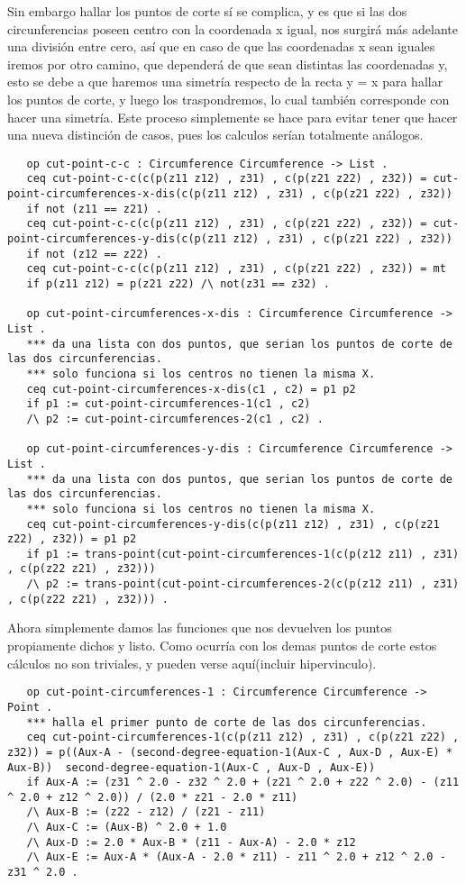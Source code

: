 {Sin embargo hallar los puntos de corte sí se complica, y es que si las dos circunferencias poseen centro con la coordenada x igual, nos surgirá más adelante una división entre cero, así que en caso de que las coordenadas x sean iguales iremos por otro camino, que dependerá de que sean distintas las coordenadas y, esto se debe a que haremos una simetría respecto de la recta y = x para hallar los puntos de corte, y luego los traspondremos, lo cual también corresponde con hacer una simetría. Este proceso simplemente se hace para evitar tener que hacer una nueva distinción de casos, pues los calculos serían totalmente análogos. \par
{\codesize
\begin{verbatim}
   op cut-point-c-c : Circumference Circumference -> List .
   ceq cut-point-c-c(c(p(z11 z12) , z31) , c(p(z21 z22) , z32)) = cut-point-circumferences-x-dis(c(p(z11 z12) , z31) , c(p(z21 z22) , z32)) 
   if not (z11 == z21) .
   ceq cut-point-c-c(c(p(z11 z12) , z31) , c(p(z21 z22) , z32)) = cut-point-circumferences-y-dis(c(p(z11 z12) , z31) , c(p(z21 z22) , z32))
   if not (z12 == z22) .
   ceq cut-point-c-c(c(p(z11 z12) , z31) , c(p(z21 z22) , z32)) = mt 
   if p(z11 z12) = p(z21 z22) /\ not(z31 == z32) .

   op cut-point-circumferences-x-dis : Circumference Circumference -> List .
   *** da una lista con dos puntos, que serian los puntos de corte de las dos circunferencias.
   *** solo funciona si los centros no tienen la misma X.
   ceq cut-point-circumferences-x-dis(c1 , c2) = p1 p2
   if p1 := cut-point-circumferences-1(c1 , c2) 
   /\ p2 := cut-point-circumferences-2(c1 , c2) .

   op cut-point-circumferences-y-dis : Circumference Circumference -> List .
   *** da una lista con dos puntos, que serian los puntos de corte de las dos circunferencias.
   *** solo funciona si los centros no tienen la misma X.
   ceq cut-point-circumferences-y-dis(c(p(z11 z12) , z31) , c(p(z21 z22) , z32)) = p1 p2
   if p1 := trans-point(cut-point-circumferences-1(c(p(z12 z11) , z31) , c(p(z22 z21) , z32))) 
   /\ p2 := trans-point(cut-point-circumferences-2(c(p(z12 z11) , z31) , c(p(z22 z21) , z32))) .

\end{verbatim}
}

Ahora simplemente damos las funciones que nos devuelven los puntos propiamente dichos y listo. Como ocurría con los demas puntos de corte estos cálculos no son triviales, y pueden verse aquí(incluir hipervinculo). 
{\codesize
\begin{verbatim}
   op cut-point-circumferences-1 : Circumference Circumference -> Point .
   *** halla el primer punto de corte de las dos circunferencias.
   ceq cut-point-circumferences-1(c(p(z11 z12) , z31) , c(p(z21 z22) , z32)) = p((Aux-A - (second-degree-equation-1(Aux-C , Aux-D , Aux-E) * Aux-B))  second-degree-equation-1(Aux-C , Aux-D , Aux-E))
   if Aux-A := (z31 ^ 2.0 - z32 ^ 2.0 + (z21 ^ 2.0 + z22 ^ 2.0) - (z11 ^ 2.0 + z12 ^ 2.0)) / (2.0 * z21 - 2.0 * z11) 
   /\ Aux-B := (z22 - z12) / (z21 - z11) 
   /\ Aux-C := (Aux-B) ^ 2.0 + 1.0
   /\ Aux-D := 2.0 * Aux-B * (z11 - Aux-A) - 2.0 * z12
   /\ Aux-E := Aux-A * (Aux-A - 2.0 * z11) - z11 ^ 2.0 + z12 ^ 2.0 - z31 ^ 2.0 .


\end{verbatim}}}
